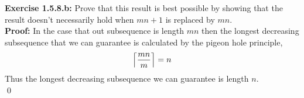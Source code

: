 \documentclass{amsart}
\begin{document}
\noindent\textbf{Exercise 1.5.8.b: } Prove that this result is best possible by showing that the result doesn’t necessarily hold when $mn+1$ is replaced by $mn$.\\
\noindent \textbf{Proof:} In the case that out subsequence is length $mn$ then the longest decreasing subsequence that we can guarantee is calculated by the pigeon hole principle,
\begin{equation}
\Bigl\lceil \frac{mn}{m} \Bigr\rceil = n
\end{equation}
Thus the longest decreasing subsequence we can guarantee is length $n$.\\
\qed





 \vspace{1in}
\end{document}
